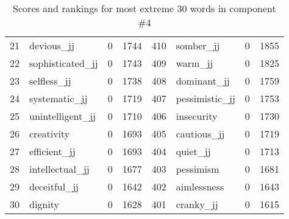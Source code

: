 \begin{table}[tbp]
\begin{tabular}{| rlr@{.}l | rlr@{.}l |}
    21 & devious\_jj & 0 & 1744    &    410 & somber\_jj & 0 & 1855 \\
    22 & sophisticated\_jj & 0 & 1743    &    409 & warm\_jj & 0 & 1825 \\
    23 & selfless\_jj & 0 & 1738    &    408 & dominant\_jj & 0 & 1759 \\
    24 & systematic\_jj & 0 & 1719    &    407 & pessimistic\_jj & 0 & 1753 \\
    25 & unintelligent\_jj & 0 & 1710    &    406 & insecurity & 0 & 1730 \\
    26 & creativity & 0 & 1693    &    405 & cautious\_jj & 0 & 1719 \\
    27 & efficient\_jj & 0 & 1693    &    404 & quiet\_jj & 0 & 1713 \\
    28 & intellectual\_jj & 0 & 1677    &    403 & pessimism & 0 & 1681 \\
    29 & deceitful\_jj & 0 & 1642    &    402 & aimlessness & 0 & 1643 \\
    30 & dignity & 0 & 1628    &    401 & cranky\_jj & 0 & 1615 \\
    \hline
    \end{tabular}
    \caption{Scores and rankings for most extreme 30 words in component \#4} 
\end{table}
\clearpage
